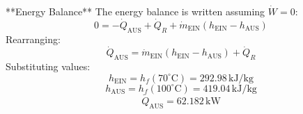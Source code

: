 **Energy Balance**  
The energy balance is written assuming \( \dot{W} = 0 \):  
\[
0 = -\dot{Q}_{\text{AUS}} + \dot{Q}_R + \dot{m}_{\text{EIN}} \left( h_{\text{EIN}} - h_{\text{AUS}} \right)
\]  
Rearranging:  
\[
\dot{Q}_{\text{AUS}} = \dot{m}_{\text{EIN}} \left( h_{\text{EIN}} - h_{\text{AUS}} \right) + \dot{Q}_R
\]  
Substituting values:  
\[
h_{\text{EIN}} = h_f(70^\circ\text{C}) = 292.98 \, \text{kJ/kg}
\]  
\[
h_{\text{AUS}} = h_f(100^\circ\text{C}) = 419.04 \, \text{kJ/kg}
\]  
\[
\dot{Q}_{\text{AUS}} = 62.182 \, \text{kW}
\]